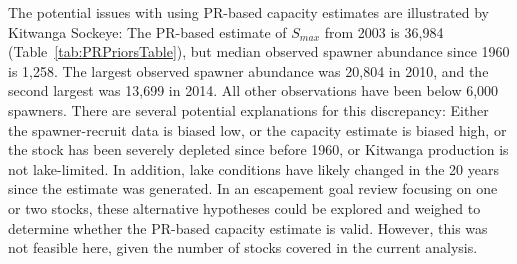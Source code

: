 \documentclass[french,11pt]{book}
\begin{document}
The potential issues with using PR-based capacity estimates are illustrated by Kitwanga Sockeye: The PR-based estimate of \(S_{max}\) from 2003 is 36,984 (Table~\ref{tab:PRPriorsTable}), but median observed spawner abundance since 1960 is 1,258. The largest observed spawner abundance was 20,804 in 2010, and the second largest was 13,699 in 2014. All other observations have been below 6,000 spawners. There are several potential explanations for this discrepancy: Either the spawner-recruit data is biased low, or the capacity estimate is biased high, or the stock has been severely depleted since before 1960, or Kitwanga production is not lake-limited. In addition, lake conditions have likely changed in the 20 years since the estimate was generated. In an escapement goal review focusing on one or two stocks, these alternative hypotheses could be explored and weighed to determine whether the PR-based capacity estimate is valid. However, this was not feasible here, given the number of stocks covered in the current analysis.

\clearpage
\end{document}
